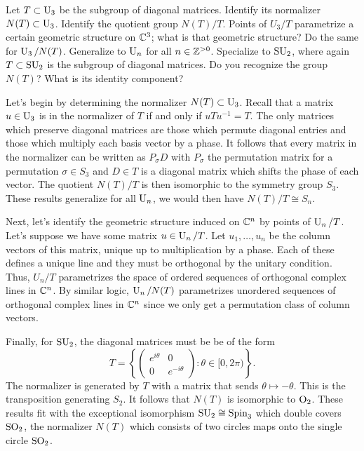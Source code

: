 \documentclass{lkx_pset}
\begin{document}
\begin{problem}{4}
Let $T\subset \operatorname{U}_3$ be the subgroup of diagonal matrices. Identify its normalizer $N(T)\subset \operatorname{U}_3$. Identify the quotient group $N(T)/T$. Points of $U_3/T$ parametrize a certain geometric structure on $\mathbb{C}^3$; what is that geometric structure? Do the same for $\operatorname{U}_3/N(T)$. Generalize to $\operatorname{U}_n$ for all $n\in \mathbb{Z}^{>0}$. Specialize to $\operatorname{SU}_2$, where again $T\subset \operatorname{SU}_2$ is the subgroup of diagonal matrices. Do you recognize the group $N(T)$? What is its identity component?
\end{problem}
\begin{solution}
	Let's begin by determining the normalizer $N(T)\subset \operatorname{U}_3$. Recall that a matrix $u\in \operatorname{U}_3$ is in the normalizer of $T$ if and only if $uTu^{-1} = T$. The only matrices which preserve diagonal matrices are those which permute diagonal entries and those which multiply each basis vector by a phase. It follows that every matrix in the normalizer can be written as $P_\sigma D$ with $P_\sigma$ the permutation matrix for a permutation $\sigma\in S_3$ and $D\in T$ is a diagonal matrix which shifts the phase of each vector. The quotient $N(T)/T$ is then isomorphic to the symmetry group $S_3$. These results generalize for all $\operatorname{U}_n$, we would then have $N(T)/T\cong S_n$.

	Next, let's identify the geometric structure induced on $\mathbb{C}^n$ by points of $\operatorname{U}_n / T$. Let's suppose we have some matrix $u\in \operatorname{U}_n/T$. Let $u_1,\ldots, u_n$ be the column vectors of this matrix, unique up to multiplication by a phase. Each of these defines a unique line and they must be orthogonal by the unitary condition.
	Thus, $U_n/T$ parametrizes the space of ordered sequences of orthogonal complex lines in $\mathbb{C}^n$. By similar logic, $\operatorname{U}_n/N(T)$ parametrizes unordered sequences of orthogonal complex lines in $\mathbb{C}^n$ since we only get a permutation class of column vectors.

	Finally, for $\operatorname{SU}_2$, the diagonal matrices must be be of the form
	\[
		T = \left\{\begin{pmatrix}e^{i\theta} & 0 \\ 0 & e^{-i\theta}\end{pmatrix} : \theta\in [0,2\pi)\right\} .
	\]
	The normalizer is generated by $T$ with a matrix that sends $\theta \mapsto -\theta$. This is the transposition generating $S_2$. It follows that $N(T)$ is isomorphic to ${\operatorname{O}}_2$. These results fit with the exceptional isomorphism $\operatorname{SU}_2 \cong \operatorname{Spin}_3$ which double covers $\operatorname{SO}_2$, the normalizer $N(T)$ which consists of two circles maps onto the single circle $\operatorname{SO}_2$.
\end{solution}
\end{document}
